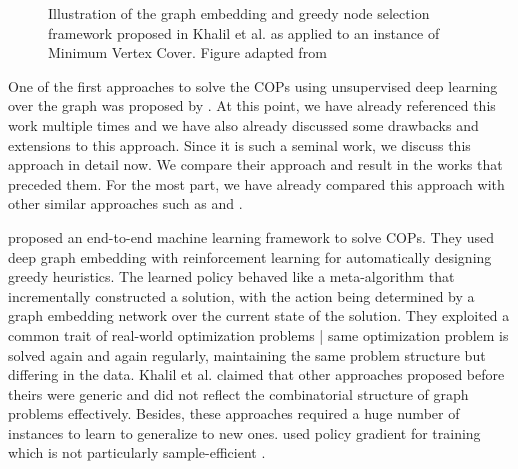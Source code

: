 \documentclass{article}
\begin{document}
\begin{figure}
    \caption{Illustration of the graph embedding and greedy node selection framework proposed in Khalil et al. as applied to an instance of Minimum Vertex Cover. Figure adapted from \cite{khalil2017learning}}
    \label{fig:graph-embedding}
\end{figure}

One of the first approaches to solve the COPs using unsupervised deep learning over the graph was proposed by \cite{khalil2017learning}. At this point, we have already referenced this work multiple times and we have also already discussed some drawbacks and extensions to this approach. Since it is such a seminal work, we discuss this approach in detail now. We compare their approach and result in the works that preceded them. For the most part, we have already compared this approach with other similar approaches such as \cite{li2018combinatorial} and \cite{mittal2019learning}.

\cite{khalil2017learning} proposed an end-to-end machine learning framework to solve COPs. They used deep graph embedding with reinforcement learning for automatically designing greedy heuristics. The learned policy behaved like a meta-algorithm that incrementally constructed a solution, with the action being determined by a graph embedding network over the current state of the solution. They exploited a common trait of real-world optimization problems | same optimization problem is solved again and again regularly, maintaining the same problem structure but differing in the data. Khalil et al. claimed that other approaches proposed before theirs \cite{vinyals2015pointer, bello2016neural} were generic and did not reflect the combinatorial structure of graph problems effectively. Besides, these approaches required a huge number of instances to learn to generalize to new ones. \cite{bello2016neural} used policy gradient for training which is not particularly sample-efficient \cite{khalil2017learning}. 
\end{document}
